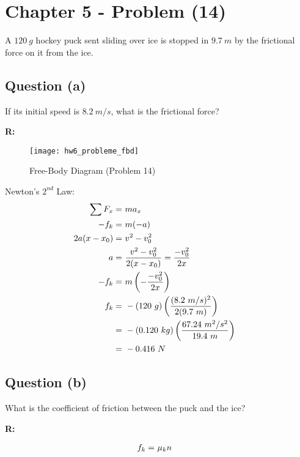 \section{Chapter 5 - Problem (14)}
	A $120 \ g$ hockey puck sent sliding over ice is stopped in $9.7 \ m$ by the frictional force on it from the ice.

	\subsection{Question (a)}

		If its initial speed is $8.2 \ m/s$, what is the frictional force?

		\textbf{R:} \newline

		\begin{figure}[H]
			\begin{center}
				\texttt{[image: hw6\_probleme\_fbd]}
				\caption{Free-Body Diagram (Problem 14)}
				\label{fig:hw6_probleme_fbd}
			\end{center}
		\end{figure}

		Newton's $2^{nd}$ Law:
		\begin{align}
			\sum F_{x} = \ &ma_{x}& \notag \\
			-f_{k} = \ &m(-a)& \notag \\
			2a(x-x_{0}) = \ &v^{2} - v_{0}^{2}& \notag \\
			a = \ &\frac{v^{2} - v_{0}^{2}}{2(x-x_{0})} = \frac{-v_{0}^{2}}{2x}& \notag \\
			-f_{k} = \ &m\left(-\frac{-v_{0}^{2}}{2x}\right)& \notag \\
			f_{k} = \ &-(120 \ g)\left(\frac{(8.2 \ m/s)^{2}}{2(9.7 \ m)}\right)& \notag \\
			= \ &-(0.120 \ kg)\left(\frac{67.24 \ m^{2}/s^{2}}{19.4 \ m}\right)& \notag \\
			= \ &-0.416 \ N&
		\end{align}

	\subsection{Question (b)}

		What is the coefficient of friction between the puck and the ice?

		\textbf{R:} \newline

		\begin{align}
			f_{k} = \ &\mu_{k}n& \notag
		\end{align}

